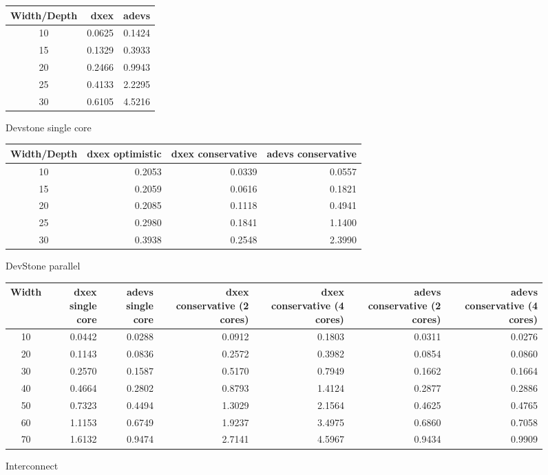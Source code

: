 \documentclass[a4paper, 11pt]{article}
\begin{document}
\begin{figure}
\begin{center}
\begin{tabular}{|c|r|r|}
\hline
Width/Depth&dxex&adevs \\
\hline
10&0.0625&0.1424\\
15&0.1329&0.3933\\
20&0.2466&0.9943\\
25&0.4133&2.2295\\
30&0.6105&4.5216\\
\hline
\end{tabular}
\end{center}
\caption{Devstone single core}
\end{figure}

\begin{figure}
\begin{center}
\begin{tabular}{|c|r|r|r|}
\hline
Width/Depth&dxex optimistic&dxex conservative&adevs conservative \\
\hline
10&0.2053&0.0339&0.0557\\
15&0.2059&0.0616&0.1821\\
20&0.2085&0.1118&0.4941\\
25&0.2980&0.1841&1.1400\\
30&0.3938&0.2548&2.3990\\
\hline
\end{tabular}
\end{center}
\caption{DevStone parallel}
\end{figure}

\begin{figure}
\begin{center}
\begin{tabular}{|c|r|r|r|r|r|r|}
\hline
Width&dxex single core&adevs single core&dxex conservative (2 cores)&dxex conservative (4 cores)&adevs conservative (2 cores)&adevs conservative (4 cores) \\
\hline
10&0.0442&0.0288&0.0912&0.1803&0.0311&0.0276\\
20&0.1143&0.0836&0.2572&0.3982&0.0854&0.0860\\
30&0.2570&0.1587&0.5170&0.7949&0.1662&0.1664\\
40&0.4664&0.2802&0.8793&1.4124&0.2877&0.2886\\
50&0.7323&0.4494&1.3029&2.1564&0.4625&0.4765\\
60&1.1153&0.6749&1.9237&3.4975&0.6860&0.7058\\
70&1.6132&0.9474&2.7141&4.5967&0.9434&0.9909\\
\hline
\end{tabular}
\end{center}
\caption{Interconnect}
\end{figure}
\end{document}
